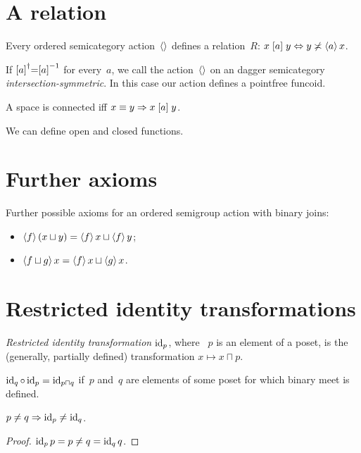 \chapter{A relation}

Every ordered semicategory action~$\left\langle \right\rangle$ defines a relation~$R$: $x\mathrel{\left[a\right]}y\Leftrightarrow y\not\asymp\left\langle a\right\rangle x$.

If $\mathrel{\left[a\right]}^{\dagger}=\mathrel{\left[a\right]}^{-1}$ for every~$a$, we call the action~$\left\langle \right\rangle$ on an dagger semicategory \emph{inter\-sec\-tion-sym\-met\-ric}. In this case our action defines a pointfree funcoid.

A space is connected iff $x\equiv y\Rightarrow x\mathrel{\left[a\right]}y$.

We can define open and closed functions.

\chapter{Further axioms}

Further possible axioms for an ordered semigroup action with binary joins:

\begin{itemize}
\item $\left\langle f\right\rangle(x\sqcup y)=\left\langle f\right\rangle x\sqcup\left\langle f\right\rangle y$;
\item $\left\langle f\sqcup g\right\rangle x=\left\langle f\right\rangle x\sqcup\left\langle g\right\rangle x$.
\end{itemize}


\chapter{Restricted identity transformations}

\emph{Restricted identity transformation} $\operatorname{id}_p$, where ~$p$ is an element of a poset, is the (generally, partially defined) transformation $x\mapsto x\sqcap p$.

\begin{obvious}
$\operatorname{id}_q\circ\operatorname{id}_p = \operatorname{id}_{p\sqcap q}$ if~$p$ and~$q$ are elements of some poset for which binary meet is defined.
\end{obvious}

\begin{prop}
$p\ne q\Rightarrow\operatorname{id}_p\ne\operatorname{id}_q$.
\end{prop}

\begin{proof}
$\operatorname{id}_p p=p \ne q = \operatorname{id}_q q$.
\end{proof}

